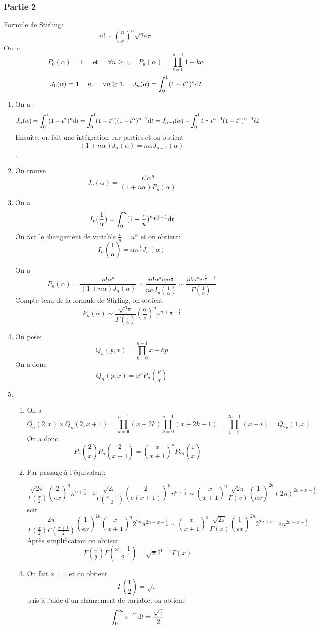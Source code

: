 \documentclass{article}
\def \de {{\rm d}}
\begin{document}
\subsubsection*{Partie 2}
Formule de Stirling:
\[n!\sim \left(\frac ne\right)^n\sqrt{2n\pi}\]
On a:
\[P_0(\alpha)=1\quad\mbox{ et }\quad \forall n\geq 1,\quad P_n(\alpha)=\prod_{k=0}^{n-1}1+k\alpha\]
\[J_0(\alpha)=1\quad\mbox{ et }\quad \forall n\geq 1,\quad J_n(\alpha)=\int_{0}^{1}(1-t^\alpha)^n\de t\]
\begin{enumerate}
\item On a : 
\[ J_n(\alpha)=\int_{0}^{1}(1-t^\alpha)^n\de t = \int_{0}^{1}(1-t^\alpha)(1-t^\alpha)^{n-1}\de t=  J_{n-1}(\alpha) - \int_{0}^{1}t\times t^{\alpha-1}(1-t^\alpha)^{n-1}\de t\]
Ensuite, on fait une intégration par parties et on obtient
\[(1+n\alpha)J_n(\alpha)= n\alpha J_{n-1}(\alpha)\].
\item On trouve
\[J_n(\alpha)=\frac{n!\alpha^n}{(1+n\alpha)P_n(\alpha)}\]
\item On a 
\[I_n(\frac{1}{\alpha})=\int_0^n (1-\frac{t}{n})^{n}t^{\frac{1}{\alpha}-1}\de t\]
On fait le changement de variable $\frac tn=u^\alpha$ et on obtient:
\[I_n(\frac{1}{\alpha})=\alpha n^{\frac{1}{\alpha}}J_n(\alpha)\]

On a
\[P_n(\alpha)=\frac{n!\alpha^n}{(1+n\alpha)J_n(\alpha)} \sim \frac{n!\alpha^n \alpha n^{\frac{1}{\alpha}}}{n\alpha I_n(\frac 1{\alpha})} \sim \frac{n!\alpha^n  n^{\frac{1}{\alpha}-1}}{ \Gamma(\frac 1{\alpha})} \]
Compte tenu de la formule de Stirling, on obtient
\[P_n(\alpha) \sim \frac{\sqrt{2\pi}}{ \Gamma(\frac 1{\alpha})} \left(\frac{\alpha}{e}\right)^n  n^{n+\frac{1}{\alpha}-\frac 12} \]
\item On pose:
\[Q_n(p,x)=\prod_{k=0}^{n-1}x+kp\]
On a donc
\[Q_n(p,x)=x^nP_n(\frac px)\]

\item \begin{enumerate}
\item On a
\[Q_n(2,x)\times  Q_n(2,x+1)=\prod_{k=0}^{n-1}(x+2k)\prod_{k=0}^{n-1}(x+2k+1) =\prod_{i=0}^{2n-1}(x+i)=Q_{2n}(1,x)\]
On a donc
\[P_n(\frac 2x)P_n(\frac 2{x+1})=\left(\frac{x}{x+1}\right)^n P_{2n}(\frac 1x)\]
\item Par passage à l'équivalent:

\[\frac{\sqrt{2\pi}}{ \Gamma(\frac x2)} \left(\frac{2}{ex}\right)^n  n^{n+\frac x2-\frac 12} \frac{\sqrt{2\pi}}{ \Gamma(\frac {x+1}2)} \left(\frac{2}{e(x+1)}\right)^n  n^{n+\frac {x}2}\sim \left(\frac{x}{x+1}\right)^n \frac{\sqrt{2\pi}}{ \Gamma(x)} \left(\frac{1}{ex}\right)^{2n}  (2n)^{2n+x-\frac 12} \]
soit
\[\frac{2\pi}{ \Gamma(\frac x2) \Gamma(\frac {x+1}2)} \left(\frac{1}{ex}\right)^{2n}\left(\frac{x}{x+1}\right)^n 2^{2n}  n^{2n+x-\frac 12}   \sim \left(\frac{x}{x+1}\right)^n \frac{\sqrt{2\pi}}{ \Gamma(x)} \left(\frac{1}{ex}\right)^{2n} 2^{2n+x-\frac 12}  n^{2n+x-\frac 12} \]
Après simplification on obtient
 \[\Gamma(\frac x2)\Gamma(\frac {x+1}2) =\sqrt\pi 2^{1-x} \Gamma(x)\]
\item On fait $x=1$ et on obtient
\[\Gamma(\frac 12)=\sqrt\pi\]
puis à l'aide d'un changement de variable, on obtient 
\[\int_0^\infty e^{-t^2}\de t=\frac{\sqrt\pi}{2}\]
\end{enumerate}
\end{enumerate}
  
\end{document}
